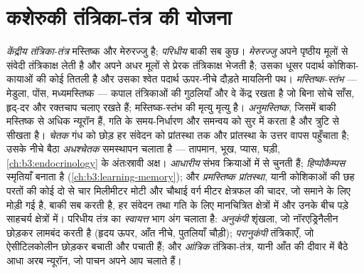 \section{कशेरुकी तंत्रिका-तंत्र की योजना}

\begin{definition}[केंद्रीय और परिधीय भाग]\label{def:b3:nervous-systems:plan}
\emph{केंद्रीय तंत्रिका-तंत्र} मस्तिष्क और मेरुरज्जु है;
\emph{परिधीय} बाकी सब कुछ। \emph{मेरुरज्जु} अपने पृष्ठीय मूलों से संवेदी
तंत्रिकाक्ष लेती है और अपने अधर मूलों से प्रेरक तंत्रिकाक्ष भेजती है;
उसका धूसर पदार्थ कोशिका-कायाओं की कोई तितली है और उसका श्वेत पदार्थ
ऊपर-नीचे दौड़ते मायलिनी पथ। \emph{मस्तिष्क-स्तंभ} --- मेडुला, पोंस,
मध्यमस्तिष्क --- कपाल तंत्रिकाओं की गुठलियाँ और वे केंद्र रखता है जो
बिना सोचे साँस, हृद्-दर और रक्तचाप चलाए रखते हैं; मस्तिष्क-स्तंभ की
मृत्यु मृत्यु है। \emph{अनुमस्तिष्क}, जिसमें बाकी मस्तिष्क से अधिक
न्यूरॉन हैं, गति के समय-निर्धारण और समन्वय को सुर में करता है और त्रुटि
से सीखता है। \emph{चेतक} गंध को छोड़ हर संवेदन को प्रांतस्था तक और
प्रांतस्था के उत्तर वापस पहुँचाता है; उसके नीचे बैठा \emph{अधश्चेतक}
समस्थापन चलाता है --- तापमान, भूख, प्यास, घड़ी,
\cref{ch:b3:endocrinology} के अंतःस्रावी अक्ष। \emph{आधारीय
} संभव क्रियाओं में से चुनती हैं; \emph{हिप्पोकैम्पस} स्मृतियाँ
बनाता है (\cref{ch:b3:learning-memory}); और \emph{प्रमस्तिष्क
प्रांतस्था}, यानी कोशिकाओं की छह परतों की कोई दो से चार मिलीमीटर मोटी
और चौथाई वर्ग मीटर क्षेत्रफल की चादर, जो समाने के लिए मोड़ी गई है,
बाकी सब करती है, हर संवेदन तथा गति के लिए मानचित्रित क्षेत्रों में और
उनके बीच पड़े साहचर्य क्षेत्रों में। परिधीय तंत्र का \emph{स्वायत्त}
भाग अंग चलाता है: \emph{अनुकंपी} शृंखला, जो नॉरएड्रिनैलीन छोड़कर
लामबंद करती है (हृदय ऊपर, आँत नीचे, पुतलियाँ चौड़ी);
\emph{परानुकंपी} तंत्रिकाएँ, जो ऐसीटिलकोलीन छोड़कर बचाती और पचाती हैं;
और \emph{आंत्रिक} तंत्रिका-तंत्र, यानी आँत की दीवार में बैठे आधा अरब
न्यूरॉन, जो पाचन अपने आप चलाते हैं।
\end{definition}

